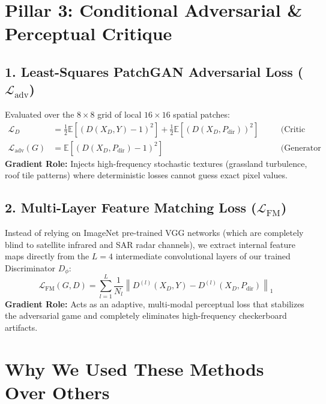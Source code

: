 \documentclass[11pt,a4paper]{article}
\begin{document}
\newpage

\section{Pillar 3: Conditional Adversarial \& Perceptual Critique}

\subsection{1. Least-Squares PatchGAN Adversarial Loss ($\mathcal{L}_{\text{adv}}$)}
Evaluated over the $8 \times 8$ grid of local $16 \times 16$ spatial patches:
\begin{align}
\mathcal{L}_D &= \frac{1}{2} \mathbb{E}\left[ \left( D(X_D, Y) - 1 \right)^2 \right] + \frac{1}{2} \mathbb{E}\left[ \left( D(X_D, P_{\text{dir}}) \right)^2 \right] \quad &&\text{(Critic Step)}\\
\mathcal{L}_{\text{adv}}(G) &= \mathbb{E}\left[ \left( D(X_D, P_{\text{dir}}) - 1 \right)^2 \right] \quad &&\text{(Generator Step)}
\end{align}
\textbf{Gradient Role:} Injects high-frequency stochastic textures (grassland turbulence, roof tile patterns) where deterministic losses cannot guess exact pixel values.

\subsection{2. Multi-Layer Feature Matching Loss ($\mathcal{L}_{\text{FM}}$)}
Instead of relying on ImageNet pre-trained VGG networks (which are completely blind to satellite infrared and SAR radar channels), we extract internal feature maps directly from the $L=4$ intermediate convolutional layers of our trained Discriminator $D_\phi$:
\begin{equation}
\mathcal{L}_{\text{FM}}(G, D) = \sum_{l=1}^L \frac{1}{N_l} \left\| D^{(l)}(X_D, Y) - D^{(l)}(X_D, P_{\text{dir}}) \right\|_1
\end{equation}
\textbf{Gradient Role:} Acts as an adaptive, multi-modal perceptual loss that stabilizes the adversarial game and completely eliminates high-frequency checkerboard artifacts.

\section{Why We Used These Methods Over Others}
\end{document}

